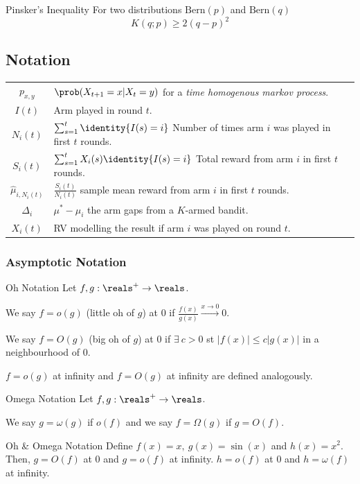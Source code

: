 \documentclass[11pt,a4paper]{article}
\begin{document}
\begin{theorem}{Pinsker's Inequality}
  For two distributions $\text{Bern}(p)$ and $\text{Bern}(q)$
  \[ K(q;p)\geq2(q-p)^2 \]
\end{theorem}

\subsection{Notation}
\begin{tabular}{|c|l|}
  \hline
  $p_{x,y}$&$\prob(X_{t+1}=x|X_{t}=y)$ for a \textit{time homogenous markov process}.\\
  $I(t)$&Arm played in round $t$.\\
  $N_i(t)$&$\sum_{s=1}^t\identity\{I(s)=i\}$ Number of times arm $i$ was played in first $t$ rounds.\\
  $S_i(t)$&$\sum_{s=1}^tX_i(s)\identity\{I(s)=i\}$ Total reward from arm $i$ in first $t$ rounds.\\
  $\hat\mu_{i,N_i(t)}$&$\frac{S_i(t)}{N_i(t)}$ sample mean reward from arm $i$ in first $t$ rounds.\\
  $\Delta_i$&$\mu^*-\mu_i$ the arm gaps from a $K$-armed bandit.\\
  $X_i(t)$&RV modelling the result if arm $i$ was played on round $t$.\\
  \hline
\end{tabular}

\subsubsection{Asymptotic Notation}

\begin{definition}{Oh Notation}
  Let $f,g:\reals^+\to\reals$.
  \par We say $f=o(g)$ (little oh of $g$) at 0 if $\frac{f(x)}{g(x)}\overset{x\to0}\longrightarrow0$.
  \par We say $f=O(g)$ (big oh of $g$) at 0 if $\exists\ c>0$ st $|f(x)|\leq c|g(x)|$ in a neighbourhood of 0.
  \par $f=o(g)$ at infinity and $f=O(g)$ at infinity are defined analogously.
\end{definition}

\begin{definition}{Omega Notation}
  Let $f,g:\reals^+\to\reals$.
  \par We say $g=\omega(g)$ if $o(f)$ and we say $f=\Omega(g)$ if $g=O(f)$.
\end{definition}

\begin{example}{Oh \& Omega Notation}
  Define $f(x)=x,\ g(x)=\sin(x)$ and $h(x)=x^2$.\\
  Then, $g=O(f)$ at 0 and $g=o(f)$ at infinity. $h=o(f)$ at 0 and $h=\omega(f)$ at infinity.
\end{example}
\end{document}
